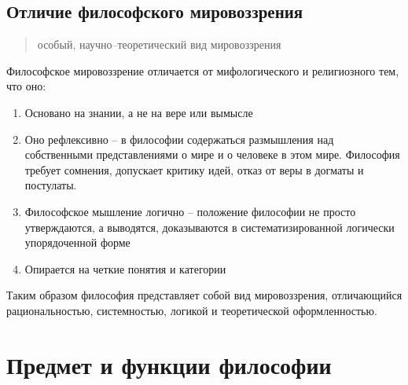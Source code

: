 \documentclass[
]{article}
\providecommand{\tightlist}{%
  \setlength{\itemsep}{0pt}\setlength{\parskip}{0pt}}
\begin{document}
\hypertarget{ux43eux442ux43bux438ux447ux438ux435-ux444ux438ux43bux43eux441ux43eux444ux441ux43aux43eux433ux43e-ux43cux438ux440ux43eux432ux43eux437ux437ux440ux435ux43dux438ux44f}{%
\subsection{Отличие философского
мировоззрения}\label{ux43eux442ux43bux438ux447ux438ux435-ux444ux438ux43bux43eux441ux43eux444ux441ux43aux43eux433ux43e-ux43cux438ux440ux43eux432ux43eux437ux437ux440ux435ux43dux438ux44f}}

\begin{quote}
\begin{description}
\tightlist
\item[\emph{Философия ---}]
особый, научно--теоретический вид мировоззрения
\end{description}
\end{quote}

Философское мировоззрение отличается от мифологического и религиозного
тем, что оно:

\begin{enumerate}
\def\labelenumi{\arabic{enumi}.}
\tightlist
\item
  Основано на знании, а не на вере или вымысле
\item
  Оно рефлексивно -- в философии содержаться размышления над
  собственными представлениями о мире и о человеке в этом мире.
  Философия требует сомнения, допускает критику идей, отказ от веры в
  догматы и постулаты.
\item
  Философское мышление логично -- положение философии не просто
  утверждаются, а выводятся, доказываются в систематизированной
  логически упорядоченной форме
\item
  Опирается на четкие понятия и категории
\end{enumerate}

Таким образом философия представляет собой вид мировоззрения,
отличающийся рациональностью, системностью, логикой и теоретической
оформленностью.

\hypertarget{ux43fux440ux435ux434ux43cux435ux442-ux438-ux444ux443ux43dux43aux446ux438ux438-ux444ux438ux43bux43eux441ux43eux444ux438ux438-1}{%
\section{Предмет и функции
философии}\label{ux43fux440ux435ux434ux43cux435ux442-ux438-ux444ux443ux43dux43aux446ux438ux438-ux444ux438ux43bux43eux441ux43eux444ux438ux438-1}}
\end{document}
